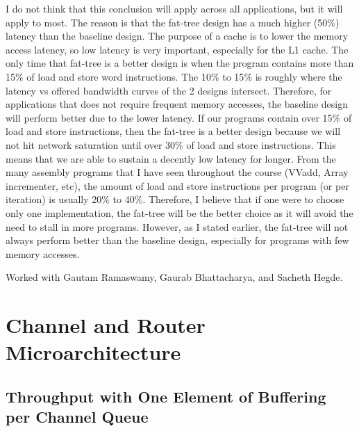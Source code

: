 \documentclass[10pt]{article}
\begin{document}
I do not think that this conclusion will apply across all applications, but it will apply to most. The reason is that the fat-tree design has a much higher (50$\%$) latency than the baseline design. The purpose of a cache is to lower the memory access latency, so low latency is very important, especially for the L1 cache. The only time that fat-tree is a better design is when the program contains more than 15$\%$ of load and store word instructions. The 10$\%$ to 15$\%$ is roughly where the latency vs offered bandwidth curves of the 2 designs intersect. Therefore, for applications that does not require frequent memory accesses, the baseline design will perform better due to the lower latency. If our programs contain over 15$\%$ of load and store instructions, then the fat-tree is a better design because we will not hit network saturation until over 30$\%$ of load and store instructions. This means that we are able to sustain a decently low latency for longer. From the many assembly programs that I have seen throughout the course (VVadd, Array incrementer, etc), the amount of load and store instructions per program (or per iteration) is usually 20$\%$ to 40$\%$. Therefore, I believe that if one were to choose only one implementation, the fat-tree will be the better choice as it will avoid the need to stall in more programs. However, as I stated earlier, the fat-tree will not always perform better than the baseline design, especially for programs with few memory accesses. 

\cleardoublepage
Worked with Gautam Ramaswamy, Gaurab Bhattacharya, and Sacheth Hegde.
\section{Channel and Router Microarchitecture}

\subsection{Throughput with One Element of Buffering per Channel Queue}
\end{document}
